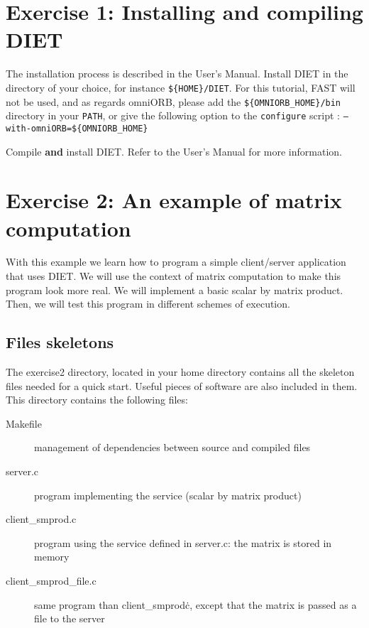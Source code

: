 \documentclass[11pt,a4paper]{article}
\begin{document}
\section{Exercise 1: Installing and compiling DIET}

The installation process is described in the User's Manual. Install
DIET in the directory of your choice, for instance
\texttt{\$\{HOME\}/DIET}. For this tutorial, FAST will not be used,
and as regards omniORB, please add the
\texttt{\$\{OMNIORB\_HOME\}/bin} directory in your \texttt{PATH}, or
give the following option to the \texttt{configure} script : \texttt{--with-omniORB=\$\{OMNIORB\_HOME\}}

Compile {\bf and} install DIET. Refer to the User's Manual for more
information.

\section{Exercise 2: An example of matrix computation}

With this example we learn how to program a simple client/server
application that uses DIET. We will use the context of matrix
computation to make this program look more real. We will implement a
basic scalar by matrix product. Then, we will test this program in
different schemes of execution.
\par

\subsection{Files skeletons}

The exercise2 directory, located in your home directory contains all
the skeleton files needed for a quick start. Useful pieces of software
are also included in them. This directory contains the following
files:

\begin{description}
\item[Makefile]{management of dependencies between source and compiled files}
\item[server.c]{program implementing the service (scalar by matrix product)}
\item[client\_smprod.c]{program using the service defined in server.c: the
    matrix is stored in memory}
\item[client\_smprod\_file.c]{same program than client\_smprod\.c, except that
    the matrix is passed as a file to the server}
\end{description}
\end{document}
